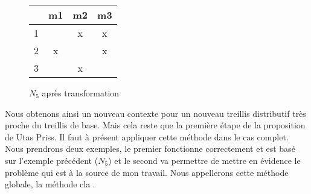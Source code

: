 \begin{figure}[H]
	\begin{minipage}[c]{0.5\textwidth}
	\begin{center}
		\begin{tabular}{ l | c c c }
			 & m1 & m2 & m3 \\
			\hline
			1 & & x & x \\
			2 & x & & x\\
			3 & & x & \\
		\end{tabular}
	\end{center}
	\end{minipage}
	\begin{minipage}[c]{0.5\textwidth}
	\begin{center}
	\end{center}
	\end{minipage}
	\caption{$N_5$ après transformation}
\end{figure}

Nous obtenons ainsi un nouveau contexte pour un nouveau treillis distributif très proche du treillis de base. Mais cela reste que la première étape de la proposition de Utas Priss. Il faut à présent appliquer cette méthode dans le cas complet. Nous prendrons deux exemples, le premier fonctionne correctement et est basé sur l'exemple précédent ($N_5$) et le second va permettre de mettre en évidence le problème qui est à la source de mon travail. Nous appellerons cette méthode globale, la \guillemotleft{} méthode cla \guillemotright{}.

